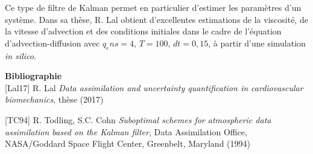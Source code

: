 \documentclass[a4paper]{article}
\newcounter{c}
\newcounter{d}
\newcounter{r}
\newcounter{e}
\newcommand{\chapitre}[1]{\stepcounter{c}\setcounter{e}{0}\setcounter{d}{0}\setcounter{r}{0}\noindent\textbf{\Large#1}\\}
\newcommand{\saut}{\vspace{0.5em}}
\begin{document}
Ce type de filtre de Kalman permet en particulier d'estimer les paramètres d'un système. Dans sa thèse, R. Lal obtient d'excellentes estimations de la viscosité, de la vitesse d'advection et des conditions initiales dans le cadre de l'équation d'advection-diffusion avec $q_ens = 4$, $T=100$, $dt=0,15$, à partir d'une simulation \emph{in silico}.

\saut
\saut
\chapitre{Bibliographie}

[Lal17] R. Lal \emph{Data assimilation and uncertainty quantification in cardiovascular biomechanics}, thèse (2017)


[TC94] R. Todling, S.C. Cohn \emph{Suboptimal schemes for atmospheric data assimilation based on the Kalman filter}, Data Assimilation Office, NASA/Goddard Space Flight Center, Greenbelt, Maryland (1994)
\end{document}
